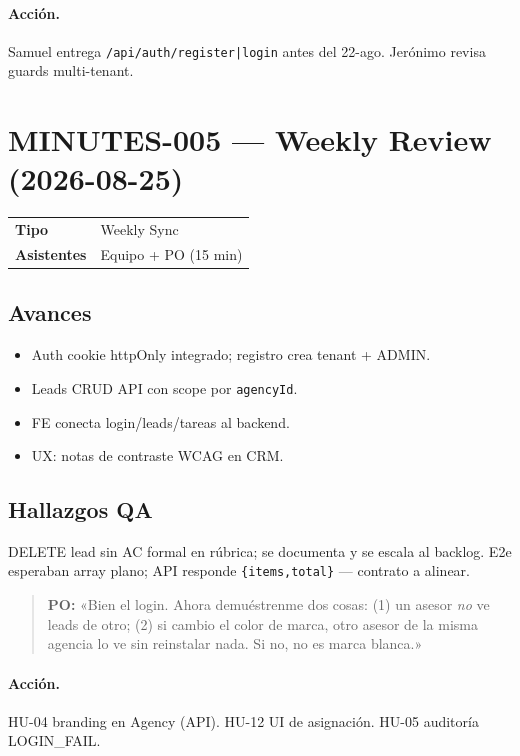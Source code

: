 \documentclass[11pt,a4paper]{article}
\begin{document}
\paragraph{Acción.} Samuel entrega \texttt{/api/auth/register|login} antes del 22-ago. Jerónimo revisa guards multi-tenant.

\section{MINUTES-005 — Weekly Review (2026-08-25)}
\begin{tabular}{@{}ll@{}}
\textbf{Tipo} & Weekly Sync \\
\textbf{Asistentes} & Equipo + PO (15 min) \\
\end{tabular}

\subsection*{Avances}
\begin{itemize}[leftmargin=*]
  \item Auth cookie httpOnly integrado; registro crea tenant + ADMIN.
  \item Leads CRUD API con scope por \texttt{agencyId}.
  \item FE conecta login/leads/tareas al backend.
  \item UX: notas de contraste WCAG en CRM.
\end{itemize}

\subsection*{Hallazgos QA}
DELETE lead sin AC formal en rúbrica; se documenta y se escala al backlog.
E2e esperaban array plano; API responde \texttt{\{items,total\}} — contrato a alinear.

\begin{quote}
\textcolor{po}{\textbf{PO:} «Bien el login. Ahora demuéstrenme dos cosas: (1) un asesor \emph{no} ve leads de otro; (2) si cambio el color de marca, otro asesor de la misma agencia lo ve sin reinstalar nada. Si no, no es marca blanca.»}
\end{quote}

\paragraph{Acción.} HU-04 branding en Agency (API). HU-12 UI de asignación. HU-05 auditoría LOGIN\_FAIL.
\end{document}
